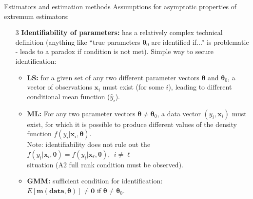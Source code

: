 \documentclass{beamer}
\begin{document}
\begin{frame}{Estimators and estimation methods}
Assumptions for asymptotic properties of extremum estimators:
\medskip
\begin{itemize}
    \item[3] \textbf{Identifiability of parameters:} has a relatively complex technical definition (anything like ``true parameters $\bm{\theta}_0$ are identified if...'' is problematic - leads to a paradox if condition is not met). Simple way to secure identification:
    \medskip
    \begin{itemize}
        \item \textbf{LS:} for a given set of any two different parameter vectors $\bm{\theta}$ and $\bm{\theta}_0$, a vector of  observations $\bm{x}_i$ must exist (for some $i$), leading to different conditional mean function ($\hat{y}_i$).
        \smallskip
        \item \textbf{ML:} For any two parameter vectors $\bm{\theta} \neq \bm{\theta}_0$, a data vector $(y_i, \bm{x}_i)$ must exist, for which it is possible to produce different values of the density function $f(y_i|\bm{x}_i,\bm{\theta})$. \\ \smallskip Note: identifiability does not rule out the  $f(y_i|\bm{x}_i,\bm{\theta}) = f(y_i|\bm{x}_{\ell},\bm{\theta}), ~~i \neq \ell$ \\situation (A2 full rank condition must be observed).
        \smallskip
        \item \textbf{GMM:} sufficient condition for identification:\\ $E[\overline{\bm{m}}(\textbf{data},\bm{\theta})] \neq \bm{0}$ if $\bm{\theta} \neq \bm{\theta}_0$.
    \end{itemize}
\end{itemize}
\end{frame}
\end{document}
